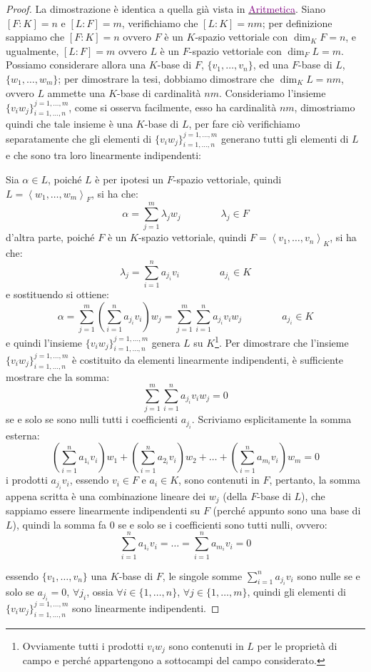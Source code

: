 \documentclass[11pt]{scrartcl}
\begin{document}
\begin{proof}
    La dimostrazione è identica a quella già vista in \href{https://github.com/diego-unipi/Appunti-Aritmetica}{\textcolor{purple}{Aritmetica}}. Siano $[F:K] = n$ e $[L:F] = m$, verifichiamo che $[L:K]=nm$;
    per definizione sappiamo che $[F:K] = n$ ovvero $F$ è un $K$-spazio vettoriale con $\dim_KF = n$, e ugualmente, $[L:F] = m$ ovvero $L$ è un $F$-spazio vettoriale con $\dim_FL = m$. Possiamo considerare allora una $K$-base di $F$, $\{v_1,\ldots,v_n\}$, ed una $F$-base di $L$, $\{w_1,\ldots,w_m\}$; per dimostrare la tesi, dobbiamo dimostrare che $\dim_KL = nm$, ovvero $L$ ammette una $K$-base di cardinalità $nm$. Consideriamo l'insieme $\{v_iw_j\}_{i=1,\ldots,n}^{j=1,\ldots,m}$, come si osserva facilmente, esso ha cardinalità $nm$, dimostriamo quindi che tale insieme è una $K$-base di $L$, per fare ciò verifichiamo separatamente che gli elementi di $\{v_iw_j\}_{i=1,\ldots,n}^{j=1,\ldots,m}$ generano tutti gli elementi di $L$ e che sono tra loro linearmente indipendenti:
	\begin{itemize}
	\ii Sia $\alpha \in L$, poiché $L$ è per ipotesi un $F$-spazio vettoriale, quindi $L = \left<w_1,\ldots,w_m\right>_F$, si ha che:
		\[ \alpha = \sum_{j=1}^{m} \lambda_jw_j
		\qquad\qquad \lambda_j \in F
		\]
		d'altra parte, poiché $F$ è un $K$-spazio vettoriale, quindi $F = \left<v_1,\ldots,v_n\right>_K$, si ha che:
		\[ \lambda_j = \sum_{i=1}^{n} a_{j_i}v_i
		\qquad\qquad a_{j_i} \in K
		\]
		e sostituendo si ottiene:
		\[ \alpha = \sum_{j=1}^{m} \left( \sum_{i=1}^{n} a_{j_i}v_i\right)w_j = \sum_{j=1}^{m}\sum_{i=1}^{n} a_{j_i}v_iw_j
		\qquad\qquad a_{j_i} \in K
		\]
    e quindi l'insieme $\{v_iw_j\}_{i=1,\ldots,n}^{j=1,\ldots,m}$ genera $L$ su $K$\footnote{Ovviamente tutti i prodotti $v_iw_j$ sono contenuti in $L$ per le proprietà di campo e perché appartengono a sottocampi del campo considerato.}.
	\ii Per dimostrare che l'insieme $\{v_iw_j\}_{i=1,\ldots,n}^{j=1,\ldots,m}$ è costituito da elementi linearmente indipendenti, è sufficiente mostrare che la somma:
		\[ \sum_{j=1}^{m}\sum_{i=1}^{n} a_{j_i}v_iw_j = 0
		\]
    se e solo se sono nulli tutti i coefficienti $a_{j_i}$. Scriviamo esplicitamente la somma esterna:
	\[ \left(\sum_{i=1}^{n} a_{1_i}v_i\right)w_1 +  \left(\sum_{i=1}^{n} a_{2_i}v_i\right)w_2 + \ldots +  \left(\sum_{i=1}^{n} a_{m_i}v_i\right)w_m = 0
	\]
    i prodotti $a_{j_i}v_i$, essendo $v_i \in F$ e $a_i \in K$, sono contenuti in $F$, pertanto, la somma appena scritta è una combinazione lineare dei $w_j$ (della $F$-base di $L$), che sappiamo essere linearmente indipendenti su $F$ (perché appunto sono una base di $L$), quindi la somma fa $0$ se e solo se i coefficienti sono tutti nulli, ovvero:
	\[ \sum_{i=1}^{n} a_{1_i}v_i =\ldots=\sum_{i=1}^{n} a_{m_i}v_i = 0
	\]
	\end{itemize}
    essendo $\{v_1,\ldots,v_n\}$ una $K$-base di $F$, le singole somme $\sum_{i=1}^{n} a_{j_i}v_i$ sono nulle se e solo se $a_{j_i} = 0$, $\forall j_i$,
    ossia $\forall i \in\{1,\ldots,n\}$, $\forall j \in \{1,\ldots,m\}$, quindi gli elementi di $\{v_iw_j\}_{i=1,\ldots,n}^{j=1,\ldots,m}$ sono linearmente indipendenti.
\end{proof}
\end{document}
